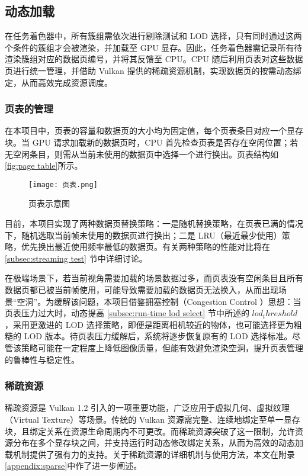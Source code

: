 \subsection{动态加载}

在任务着色器中，所有簇组需依次进行剔除测试和 LOD 选择，只有同时通过这两个条件的簇组才会被渲染，并加载至 GPU 显存。因此，任务着色器需记录所有待渲染簇组对应的数据页编号，并将其反馈至 CPU。CPU 随后利用页表对这些数据页进行统一管理，并借助 Vulkan 提供的稀疏资源机制，实现数据页的按需动态绑定，从而高效完成资源调度。

\subsubsection{页表的管理}

在本项目中，页表的容量和数据页的大小均为固定值，每个页表条目对应一个显存块。当 GPU 请求加载新的数据页时，CPU 首先检查页表是否存在空闲位置；若无空闲条目，则需从当前未使用的数据页中选择一个进行换出。页表结构如\autoref{fig:page table}所示。

\begin{figure}[htbp]
\centering
\texttt{[image: 页表.png]}
\caption{\label{fig:page table}页表示意图}
\end{figure}

目前，本项目实现了两种数据页替换策略：一是随机替换策略，在页表已满的情况下，随机选取当前帧未使用的数据页进行换出；二是 LRU（最近最少使用）策略，优先换出最近使用频率最低的数据页。有关两种策略的性能对比将在 \ref{subsec:streaming test} 节中详细讨论。

在极端场景下，若当前视角需要加载的场景数据过多，而页表没有空闲条目且所有数据页都已被当前帧使用，可能导致需要加载的数据页无法换入，从而出现场景“空洞”。为缓解该问题，本项目借鉴拥塞控制（Congestion Control
）思想\cite{Wiki-congestion}：当页表压力过大时，动态提高 \ref{subsec:run-time lod select} 节中所述的 $lod_threshold$，采用更激进的 LOD 选择策略，即便是距离相机较近的物体，也可能选择更为粗糙的 LOD 版本。待页表压力缓解后，系统将逐步恢复原有的 LOD 选择标准。尽管该策略可能在一定程度上降低图像质量，但能有效避免渲染空洞，提升页表管理的鲁棒性与稳定性。

\subsubsection{稀疏资源}

稀疏资源是 Vulkan 1.2 引入的一项重要功能，广泛应用于虚拟几何、虚拟纹理（Virtual Texture）等场景\cite{SparseResources}。传统的 Vulkan 资源需完整、连续地绑定至单一显存块，且绑定关系在资源生命周期内不可更改。而稀疏资源突破了这一限制，允许资源分布在多个显存块之间，并支持运行时动态修改绑定关系，从而为高效的动态加载机制提供了强有力的支持。关于稀疏资源的详细机制与使用方法，本文在附录\ref{appendix:sparse}中作了进一步阐述。


